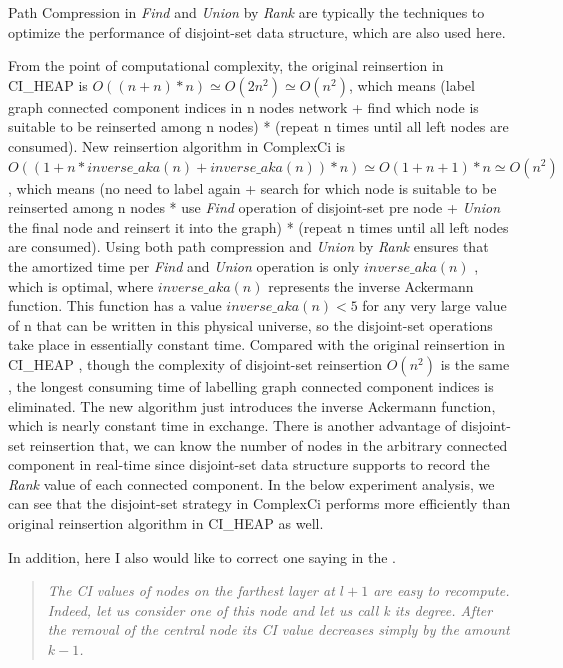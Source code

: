 \documentclass{article}
\newenvironment{itquote}
{\begin{quote}\itshape}
	{\end{quote}\ignorespacesafterend}
\begin{document}
\begin{enumerate}
\begin{item}
		Path Compression in \textit{Find} and \textit{Union} by \textit{Rank} are typically the techniques to optimize the performance of disjoint-set data structure\cite{wikiDisjointsetdatastructure}, which are also used here.
		 
		From the point of computational complexity, the original reinsertion in CI\_HEAP is $O((n+n)*n) \simeq O(2n^2) \simeq O(n^2)$, which means (label graph connected component indices in n nodes network + find which node is suitable to be reinserted among n nodes) * (repeat n times until all left nodes are consumed). New reinsertion algorithm in ComplexCi is $O((1+n*inverse\_aka(n)+inverse\_aka(n)) *n) \simeq O(1+n+1)*n \simeq O(n^2)$ , which means (no need to label again + search for which node is suitable to be reinserted among n nodes * use \textit{Find} operation of disjoint-set pre node + \textit{Union} the final node and reinsert it into the graph) * (repeat n times until all left nodes are consumed). Using both path compression and \textit{Union} by \textit{Rank} ensures that the amortized time per \textit{Find} and \textit{Union} operation is only $inverse\_aka(n)$ \cite{tarjan1979class}\cite{tarjan1984worst} , which is optimal, where $inverse\_aka(n)$ represents the inverse Ackermann function. This function has a value $inverse\_aka(n)<5$ for any very large value of n that can be written in this physical universe, so the disjoint-set operations take place in essentially constant time\cite{wikiDisjointsetdatastructure}. Compared with the original reinsertion in CI\_HEAP , though the complexity of disjoint-set reinsertion $O(n^2)$ is the same , the longest consuming time of labelling graph connected component indices is eliminated. The new algorithm just introduces the inverse Ackermann function, which is nearly constant time in exchange. There is another advantage of disjoint-set reinsertion that, we can know the number of nodes in the arbitrary connected component in real-time since disjoint-set data structure supports to record the \textit{Rank} value of each connected component. In the below experiment analysis, we can see that the disjoint-set strategy in ComplexCi performs more efficiently than original reinsertion algorithm in CI\_HEAP as well.


	\end{item}
	\end{enumerate}	

	
	In addition, here I also would like to correct one saying in the \cite{morone2016collective}. 
	
	\begin{itquote}
		The CI values of nodes on the farthest layer at $l + 1$ are easy to recompute. Indeed, let us consider one of this node and let us call k its degree. After the removal of the central node its CI value decreases simply by the amount $k − 1$.
	\end{itquote}
\end{document}
